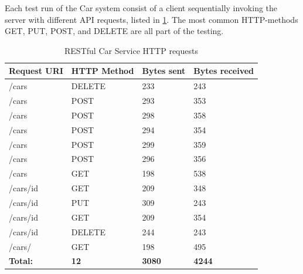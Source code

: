  Each test run of the Car system consist of a client sequentially invoking the
 server with different API requests, listed in \cref{table:car-requests}. The
 most common HTTP-methods GET, PUT, POST, and DELETE are all part of the
 testing.



\begin{table}[h]
\begin{tabular}{|l|l|l|l|}
\hline
\textbf{Request URI} & \textbf{HTTP Method} & \textbf{Bytes sent} & \textbf{Bytes received} \\ \hline
/cars                   & DELETE                  & 233                 & 243           \\ \hline
/cars                   & POST                  & 293                 & 353           \\ \hline
/cars                    & POST                 & 298                 & 358           \\ \hline
/cars                    & POST                 & 294                 & 354           \\ \hline
/cars                    & POST                 & 299                 & 359           \\ \hline
/cars                    & POST                 & 296                 & 356           \\ \hline
/cars                    & GET                 & 198                 & 538           \\ \hline
/cars/{id}                    & GET                 & 209                 & 348           \\ \hline
/cars/{id}                    & PUT                 & 309                 & 243           \\ \hline
/cars/{id}                   & GET                 & 209                 & 354           \\ \hline
/cars/{id}                   & DELETE                 & 244                 & 243           \\ \hline
/cars/                   & GET                 & 198                 & 495           \\ \hline
\textbf{Total:}       & \textbf{12}               & \textbf{3080}                & \textbf{4244}          \\ \hline
\end{tabular}
\caption{RESTful Car Service HTTP requests}
\label{table:car-requests}
\end{table}


